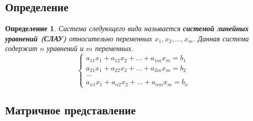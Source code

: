 \documentclass[]{article}
\newtheorem{dfn}{Определение}
\begin{document}
\subsection{Определение}
\begin{dfn}
Система следующего вида называется \textbf{системой линейных уравнений (СЛАУ)} относительно переменных $x_1,x_2,\ldots,x_m$. Данная система содержит $n$ уравнений и $m$ переменных.
\begin{equation*}
\begin{cases}
	a_{11}x_1 + a_{12}x_2 + \ldots + a_{1m}x_m=b_1
	\\
	a_{21}x_1 + a_{22}x_2 + \ldots + a_{2m}x_m=b_2
	\\
	\ldots
	\\
	a_{n1}x_1 + a_{n2}x_2 + \ldots + a_{nm}x_m=b_n
\end{cases}
\end{equation*}
\end{dfn}
\subsection{Матричное представление}
\end{document}

